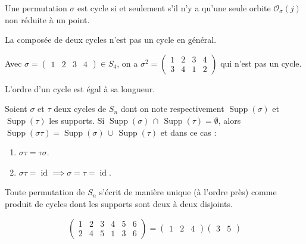 
	\begin{proposition}
		Une permutation $\sigma$ est cycle si et seulement s'il n'y a qu'une seule orbite $\mathcal{O}_\sigma(j)$ non réduite à un point.
	\end{proposition}

	\begin{remark}
		La composée de deux cycles n'est pas un cycle en général.
	\end{remark}

	\begin{example}
		Avec $\sigma = \begin{pmatrix} 1 & 2 & 3 & 4 \end{pmatrix} \in S_4$, on a $\sigma^2 = \begin{pmatrix} 1 & 2 & 3 & 4 \\ 3 & 4 & 1 & 2 \end{pmatrix}$ qui n'est pas un cycle.
	\end{example}

	\begin{proposition}
		L'ordre d'un cycle est égal à sa longueur.
	\end{proposition}


	\begin{proposition}
		Soient $\sigma$ et $\tau$ deux cycles de $S_n$ dont on note respectivement $\operatorname{Supp}(\sigma)$ et $\operatorname{Supp}(\tau)$ les supports. Si $\operatorname{Supp}(\sigma) \, \cap \, \operatorname{Supp}(\tau) = \emptyset$, alors $\operatorname{Supp}(\sigma\tau) = \operatorname{Supp}(\sigma) \, \cup \, \operatorname{Supp}(\tau)$ et dans ce cas :
		\begin{enumerate}[label=(\roman*)]
			\item $\sigma\tau = \tau\sigma$.
			\item $\sigma\tau = \operatorname{id} \implies \sigma = \tau = \operatorname{id}$.
		\end{enumerate}
	\end{proposition}

	\begin{theorem}
		Toute permutation de $S_n$ s'écrit de manière unique (à l'ordre près) comme produit de cycles dont les supports sont deux à deux disjoints.
	\end{theorem}

	\begin{example}
		\label{105-1}
		\[
		\begin{pmatrix}
			1 & 2 & 3 & 4 & 5 & 6 \\
			2 & 4 & 5 & 1 & 3 & 6
		\end{pmatrix}
		=
		\begin{pmatrix} 1 & 2 & 4 \end{pmatrix}\begin{pmatrix} 3 & 5 \end{pmatrix}
		\]
	\end{example}

